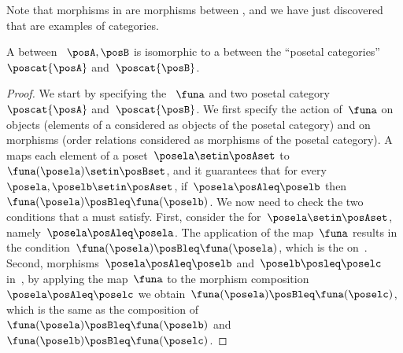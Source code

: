 
Note that morphisms in \Pos are morphisms between , and we have just discovered that  are examples of categories.
\begin{lemma}
    \label{lem:posetfunctor}
    A  between ~$\posA,\posB$ is isomorphic to a  between the ``posetal categories''~$\poscat{\posA}$ and~$\poscat{\posB}$.
\end{lemma}
\begin{proof}
    We start by specifying the ~$\funa$ and two posetal category~$\poscat{\posA}$ and~$\poscat{\posB}$.
    We first specify the action of~$\funa$ on objects (elements of a  considered as objects of the posetal category) and on morphisms (order relations considered as morphisms of the posetal category).
    A  maps each element of a poset~$\posela\setin \posAset$ to~$\funa(\posela) \setin \posBset$, and it guarantees that for every~$\posela,\poselb\setin \posAset$, if~$\posela\posAleq \poselb$ then~$\funa(\posela)\posBleq \funa(\poselb)$.
    We now need to check the two conditions that a  must satisfy.
    First, consider the  for~$\posela\setin \posAset$, namely~$\posela \posAleq \posela$.
    The application of the map~$\funa$ results in the condition~$\funa(\posela)\posBleq \funa(\posela)$, which is the  on~\posB.
    Second, morphisms~$\posela\posAleq \poselb$ and~$\poselb\posleq \poselc$ in~\posA, by applying the map~$\funa$ to the morphism composition~$\posela\posAleq \poselc$ we obtain~$\funa(\posela)\posBleq \funa(\poselc)$, which is the same as the composition of~$\funa(\posela)\posBleq \funa(\poselb)$ and~$\funa(\poselb)\posBleq \funa(\poselc)$.
\end{proof}

